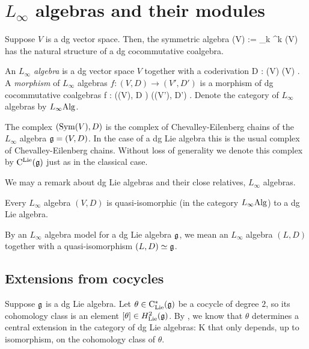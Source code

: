 \appendix

\section{$L_\infty$ algebras and their modules}



Suppose $V$ is a dg vector space. Then, the symmetric algebra 
\ben
\Sym(V) := \prod_{k} \Sym^{k} (V)
\een
has the natural structure of a dg cocommutative coalgebra.

\begin{dfn} An {\em $L_\infty$ algebra} is a dg vector space $V$ together with a coderivation
\ben
D : \Sym(V) \to \Sym(V) .
\een
A {\em morphism} of $L_\infty$ algebras $f : (V,D) \to (V',D')$ is a morphism of dg cocommutative coalgebras
\ben
f : \left(\Sym(V), D \right) \to \left(\Sym(V'), D'\right) .
\een
Denote the category of $L_\infty$ algebras by $L_\infty{\rm Alg}$. 
\end{dfn}

The complex $({\rm Sym}(V), D)$ is the complex of Chevalley-Eilenberg chains of the $L_\infty$ algebra $\mathfrak g = (V,D)$. In the case of a dg Lie algebra this is the usual complex of Chevalley-Eilenberg chains. Without loss of generality we denote this complex by ${\rm C}^{\rm Lie}(\mathfrak g)$ just as in the classical case.

We may a remark about dg Lie algebras and their close relatives, $L_\infty$ algebras. 

\begin{thm} Every $L_\infty$ algebra $(V, D)$ is quasi-isomorphic (in the category $L_\infty{\rm Alg}$) to a dg Lie algebra.
\end{thm}

By an $L_\infty$ algebra model for a dg Lie algebra $\mathfrak g$, we mean an $L_\infty$ algebra $(L, D)$ together with a quasi-isomorphism $(L, D) \simeq \mathfrak g$. 

\subsection{Extensions from cocycles}

Suppose $\mathfrak g$ is a dg Lie algebra. Let $\theta \in {\rm C}_{\rm Lie}^*(\mathfrak g)$ be a cocycle of degree $2$, so its cohomology class is an element $[\theta] \in H^{2}_{\rm Lie}(\mathfrak g)$. By , we know that $\theta$ determines a central extension in the category of dg Lie algebras:
 \to \CC\cdot K \to \Hat{\fg} \to \fg {} 
\een
that only depends, up to isomorphism, on the cohomology class of $\theta$. 

